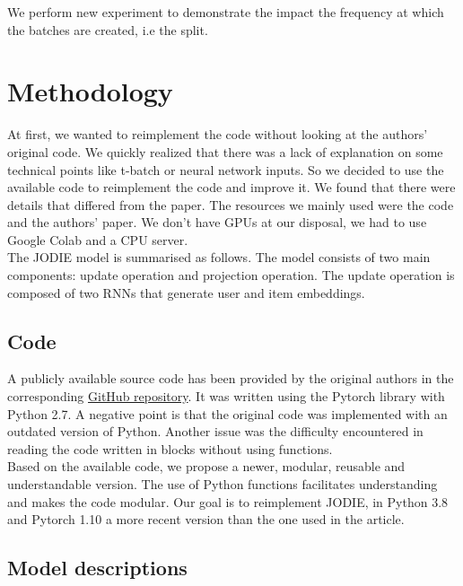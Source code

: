 We perform new experiment to demonstrate the impact  the frequency at which the batches are created, i.e the split.
\section*{Methodology}

At first, we wanted to reimplement the code without looking at the authors' original code. We quickly realized that there was a lack of explanation on some technical points like t-batch or neural network inputs. So we decided to use the available code to reimplement the code and improve it. We found that there were details that differed from the paper. The resources we mainly used were the code and the authors' paper. We don't have GPUs at our disposal, we had to use Google Colab and a CPU server.\\

The JODIE model is summarised as follows. The model consists of two main components: update operation and projection operation. The update operation is composed of two RNNs that generate user and item embeddings.

\subsection*{Code}

A publicly available source code has been provided by the original authors in the corresponding \href{https://github.com/srijankr/jodie}{GitHub repository}. It was written using the Pytorch \supercite{NEURIPS2019_bdbca288} library with Python 2.7. A negative point is that the original code was implemented with an outdated version of Python. Another issue was the difficulty encountered in reading the code written in blocks without using functions.\\

Based on the available code, we propose a newer, modular, reusable and understandable version. The use of Python functions facilitates understanding and makes the code modular. Our goal is to reimplement JODIE, in Python 3.8 and Pytorch \supercite{NEURIPS2019_bdbca288} 1.10 a more recent version than the one used in the article.

\subsection*{Model descriptions}

